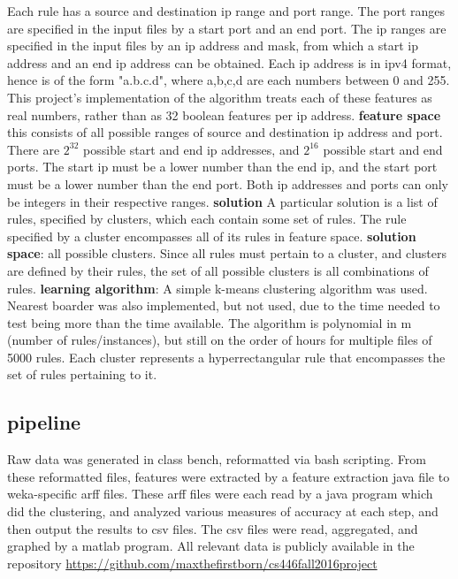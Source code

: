 \documentclass[11pt,letterpaper]{article}
\begin{document}
Each rule has a source and destination ip range and port range. The port ranges are specified in the input files by a start port and an end port. The ip ranges are specified in the input files by an ip address and mask, from which a start ip address and an end ip address can be obtained. Each ip address is in ipv4 format, hence is of the form "a.b.c.d", where a,b,c,d are each numbers between 0 and 255. This project's implementation of the algorithm treats each of these features as real numbers, rather than as 32 boolean features per ip address.
\newline \newline
{\bf feature space} this consists of all possible ranges of source and destination ip address and port. There are $2^{32}$ possible start and end ip addresses, and $2^{16}$ possible start and end ports. The start ip must be a lower number than the end ip, and the start port must be a lower number than the end port. Both ip addresses and ports can only be integers in their respective ranges.
\newline \newline
{\bf solution} A particular solution is a list of rules, specified by clusters, which each contain some set of rules. The rule specified by a cluster encompasses all of its rules in feature space. 
\newline \newline
{\bf solution space}: all possible clusters. Since all rules must pertain to a cluster, and clusters are defined by their rules, the set of all possible clusters is all combinations of rules. 
\newline \newline
{\bf learning algorithm}: A simple k-means clustering algorithm was used. Nearest boarder was also implemented, but not used, due to the time needed to test being more than the time available. The algorithm is polynomial in m (number of rules/instances), but still on the order of hours for multiple files of 5000 rules. Each cluster represents a hyperrectangular rule that encompasses the set of rules pertaining to it. 
\subsection{pipeline}
Raw data was generated in class bench, reformatted via bash scripting. From these reformatted files, features were extracted by a feature extraction java file to weka-specific arff files. These arff files were each read by a java program which did the clustering, and analyzed various measures of accuracy at each step, and then output the results to csv files. The csv files were read, aggregated, and graphed by a matlab program. All relevant data is publicly available in the repository \url{https://github.com/maxthefirstborn/cs446fall2016project}
\end{document}
